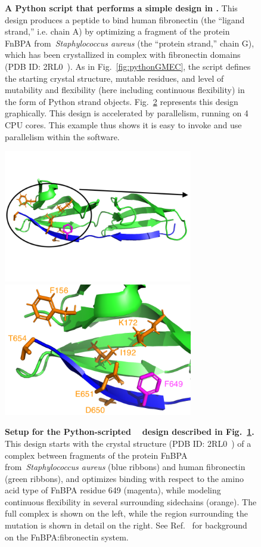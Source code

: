 \begin{figure}
\vspace{-0.7in}
\resizebox{\textwidth}{!}
{
	
}
\caption{\textbf{A Python script that performs a simple \bbks design in .}  This design produces a peptide to bind human fibronectin (the ``ligand strand,'' i.e. chain A) by optimizing a fragment of the protein FnBPA from~\textit{Staphylococcus aureus} (the ``protein strand,'' chain G), which has been crystallized in complex with fibronectin domains (PDB ID: 2RL0~\cite{2RL0}).  As in Fig.~\ref{fig:pythonGMEC}, the script defines the starting crystal structure, mutable residues, and level of mutability and flexibility (here including continuous flexibility) in the form of Python strand objects.   Fig.~\ref{fig:pythonBBKSpic} represents this design graphically.  This design is accelerated by parallelism, running on 4 CPU cores.  This example thus shows it is easy to invoke and use parallelism within the  software.  }
\label{fig:pythonBBKS}
\end{figure}

\begin{figure}
\includegraphics[width=3.25in]{figures/python_bbks_full.png}\includegraphics[width=3.25in]{figures/python_bbks_zoom.png}
\caption{\textbf{Setup for the Python-scripted \bbks~\cite{BBK*} design described in Fig.~\ref{fig:pythonBBKS}.}  This design starts with the crystal structure (PDB ID: 2RL0~\cite{2RL0}) of a complex between fragments of the protein FnBPA from~\textit{Staphylococcus aureus} (blue ribbons) and human fibronectin (green ribbons), and optimizes binding with respect to the amino acid type of FnBPA residue 649 (magenta), while modeling continuous flexibility in several surrounding sidechains (orange).  The full complex is shown on the left, while the region surrounding the mutation is shown in detail on the right.  See Ref.~ for background on the FnBPA:fibronectin system.  }
\label{fig:pythonBBKSpic}
\end{figure}